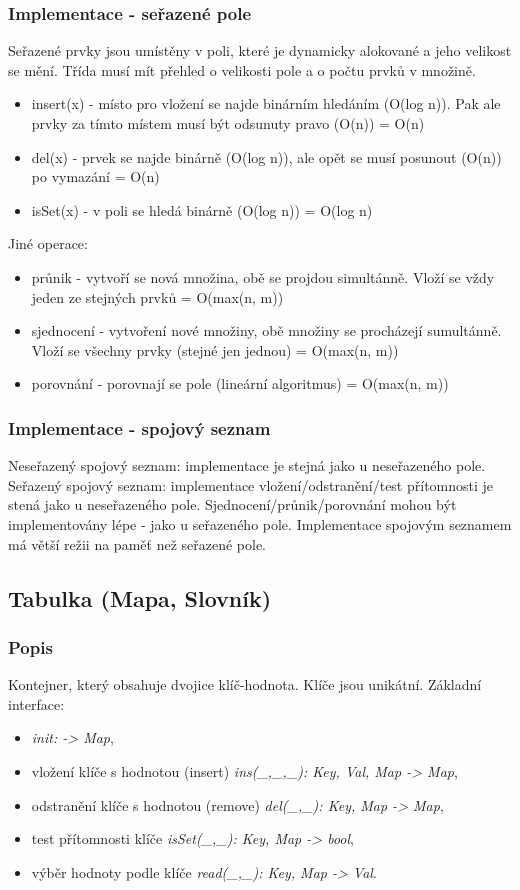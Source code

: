 \documentclass{szzclass}
\begin{document}
\subsubsection{Implementace - seřazené pole}
Seřazené prvky jsou umístěny v poli, které je dynamicky alokované a jeho velikost se mění. Třída musí mít přehled o velikosti pole
a o počtu prvků v množině.
\begin{itemize}
    \item insert(x) - místo pro vložení se najde binárním hledáním (O(log n)). Pak ale prvky za tímto místem musí být odsunuty pravo (O(n)) = O(n)
    \item del(x) - prvek se najde binárně (O(log n)), ale opět se musí posunout (O(n)) po vymazání = O(n)
    \item isSet(x) - v poli se hledá binárně (O(log n)) = O(log n)
\end{itemize}
Jiné operace:
\begin{itemize}
    \item průnik - vytvoří se nová množina, obě se projdou simultánně. Vloží se vždy jeden ze stejných prvků = O(max(n, m))
    \item sjednocení - vytvoření nové množiny, obě množiny se procházejí sumultánně. Vloží se všechny prvky (stejné jen jednou) = O(max(n, m))
    \item porovnání - porovnají se pole (lineární algoritmus) = O(max(n, m))
\end{itemize}
\subsubsection{Implementace - spojový seznam}
Neseřazený spojový seznam: implementace je stejná jako u neseřazeného pole.\newline
Seřazený spojový seznam: implementace vložení/odstranění/test přítomnosti je stená jako u neseřazeného pole. Sjednocení/průnik/porovnání mohou být
implementovány lépe - jako u seřazeného pole.\newline
Implementace spojovým seznamem má větší režii na paměť než seřazené pole.


\subsection{Tabulka (Mapa, Slovník)}
\subsubsection{Popis}
Kontejner, který obsahuje dvojice klíč-hodnota. Klíče jsou unikátní. Základní interface:
\begin{itemize}
    \item \textit{init: -> Map},
    \item vložení klíče s hodnotou (insert) \textit{ins(\_,\_,\_): Key, Val, Map -> Map},
    \item odstranění klíče s hodnotou (remove) \textit{del(\_,\_): Key, Map -> Map},
    \item test přítomnosti klíče \textit{isSet(\_,\_): Key, Map -> bool},
    \item výběr hodnoty podle klíče \textit{read(\_,\_): Key, Map -> Val}.
\end{itemize}
\end{document}
